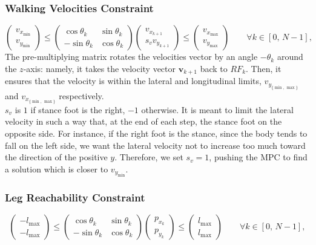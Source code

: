\documentclass[main.tex]{subfiles}
\begin{document}
\subsubsection{Walking Velocities Constraint}
\[
\begin{pmatrix}
v_{x_{\min}} \\
v_{y_{\min}}
\end{pmatrix}
\le
\begin{pmatrix}
\cos \theta_k & \sin \theta_k \\
-\sin \theta_k & \cos \theta_k
\end{pmatrix}
\begin{pmatrix}
v_{x_{k+1}} \\
s_v v_{y_{k+1}}
\end{pmatrix}
\le
\begin{pmatrix}
v_{x_{\max}} \\
v_{y_{\max}}
\end{pmatrix}
\qquad \forall k \in \left[ 0,\, N-1\right],
\]
The pre-multiplying matrix rotates the velocities vector by an angle $-\theta_k$ around the $z$-axis: namely, it takes the velocity vector $\mathbf{v}_{k+1}$ back to $RF_{k}$. 
Then, it ensures that the velocity is within the lateral and longitudinal limits, $v_{y_{\{\min,\, \max\}}}$ and $v_{x_{\{\min,\, \max\}}}$ respectively.\\
$s_v$ is $1$ if stance foot is the right, $-1$ otherwise. It is meant to limit the lateral velocity in such a way that, at the end of each step, the stance foot on the opposite side.
For instance, if the right foot is the stance, since the body tends to fall on the left side, we want the lateral velocity not to increase too much toward the direction of the positive $y$. Therefore, we set $s_v=1$, pushing the MPC to find a solution which is closer to $v_{y_{\min}}$.


\subsubsection{Leg Reachability Constraint}
\[
\begin{pmatrix}
-l_{\max} \\
-l_{\max}
\end{pmatrix}
\le
\begin{pmatrix}
\cos \theta_k & \sin \theta_k \\
-\sin \theta_k & \cos \theta_k
\end{pmatrix}
\begin{pmatrix}
p_{x_k} \\
p_{y_k}
\end{pmatrix}
\le
\begin{pmatrix}
l_{\max} \\
l_{\max}
\end{pmatrix}
\qquad \forall k \in \left[0,\, N-1 \right],
\]
\end{document}
